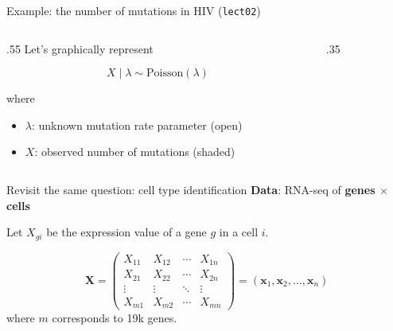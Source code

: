 \documentclass[
  12pt,
  ignorenonframetext,
  aspectratio=169]{beamer}
\begin{document}
\begin{frame}{Example: the number of mutations in HIV (\texttt{lect02})}
\protect{}\label{example-the-number-of-mutations-in-hiv-lect02}
\begin{columns}[T]
\begin{column}{.55\linewidth}
Let's graphically represent

\[X \mid \lambda \sim \text{Poisson}(\lambda)\]

where

\begin{itemize}
\item
  \(\lambda\): unknown mutation rate parameter (open)
\item
  \(X\): observed number of mutations (shaded)
\end{itemize}
\end{column}

\begin{column}{.35\linewidth}
\begin{center}
\end{center}
\end{column}
\end{columns}
\end{frame}

\begin{frame}{Revisit the same question: cell type identification}
\protect{}\label{revisit-the-same-question-cell-type-identification}
\textbf{Data}: RNA-seq of \textbf{genes \(\times\) cells}

\large

Let \(X_{gi}\) be the expression value of a gene \(g\) in a cell \(i\).

\[
\mathbf{X} = \begin{pmatrix}
X_{11} & X_{12} & \cdots & X_{1n} \\
X_{21} & X_{22} & \cdots & X_{2n} \\
\vdots & \vdots & \ddots & \vdots \\
X_{m1} & X_{m2} & \cdots & X_{mn}
\end{pmatrix}
=
\left(
\mathbf{x}_{1}, \mathbf{x}_{2}, \ldots, \mathbf{x}_{n}
\right)\] where \(m\) corresponds to 19k genes.
\end{frame}
\end{document}
